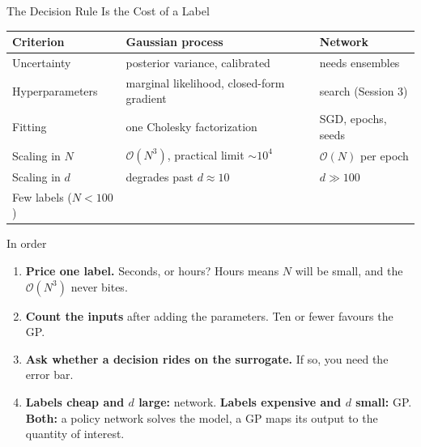 \documentclass[aspectratio=169,11pt]{beamer}
\newcommand{\yes}{\textcolor{darkgreen}{\ding{51}}}
\newcommand{\no}{\textcolor{harvardcrimson}{\ding{55}}}
\newcommand{\mixed}{\textcolor{softorange}{\ding{108}}}
\begin{document}
\begin{frame}{The Decision Rule Is the Cost of a Label}
\begin{center}
\scriptsize
\setlength{\tabcolsep}{4pt}
\begin{tabular}{l l l}
\toprule
\textbf{Criterion} & \textbf{Gaussian process} & \textbf{Network} \\
\midrule
Uncertainty & \yes posterior variance, calibrated & \no needs ensembles \\
Hyperparameters & \yes marginal likelihood, closed-form gradient & \mixed search (Session 3) \\
Fitting & \yes one Cholesky factorization & \mixed SGD, epochs, seeds \\
Scaling in $N$ & \no $\mathcal{O}(N^3)$, practical limit ${\sim}10^4$ & \yes $\mathcal{O}(N)$ per epoch \\
Scaling in $d$ & \no degrades past $d \approx 10$ & \yes $d \gg 100$ \\
Few labels ($N < 100$) & \yes & \no \\
\bottomrule
\end{tabular}
\end{center}

\vspace{0.05cm}
\begin{alertblock}{In order}
\footnotesize
\begin{enumerate}\itemsep1pt
  \item \textbf{Price one label.} Seconds, or hours? Hours means $N$ will be small, and the $\mathcal{O}(N^3)$ never bites.
  \item \textbf{Count the inputs} after adding the parameters. Ten or fewer favours the GP.
  \item \textbf{Ask whether a decision rides on the surrogate.} If so, you need the error bar.
  \item \textbf{Labels cheap and $d$ large:} network. \textbf{Labels expensive and $d$ small:} GP. \textbf{Both:} a policy network solves the model, a GP maps its output to the quantity of interest.
\end{enumerate}
\end{alertblock}
\end{frame}
\end{document}
